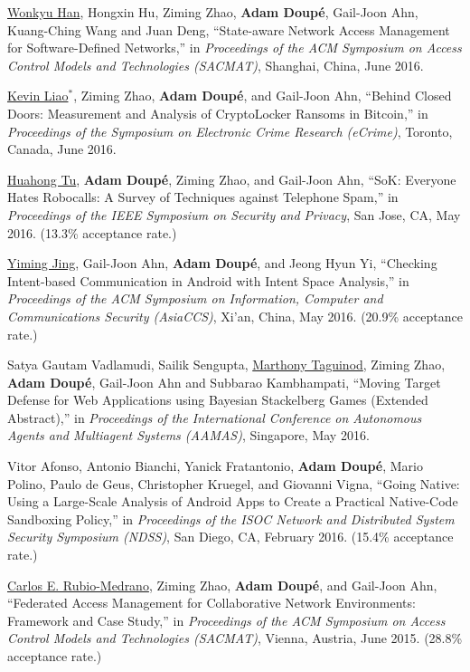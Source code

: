 \documentclass[11pt,letterpaper,sans]{moderncv}
\begin{document}
\begin{etaremune}
\item \underline{Wonkyu Han}, Hongxin Hu, Ziming Zhao, \textbf{Adam
  Doup\'e}, Gail-Joon Ahn, Kuang-Ching Wang and Juan Deng,
  ``State-aware Network Access Management for Software-Defined
  Networks,'' in \emph{Proceedings of the ACM Symposium on Access
    Control Models and Technologies (SACMAT)}, Shanghai, China, June
  2016.

\item \underline{Kevin Liao}$^*$, Ziming Zhao, \textbf{Adam Doup\'e},
  and Gail-Joon Ahn, ``Behind Closed Doors: Measurement and Analysis
  of CryptoLocker Ransoms in Bitcoin,'' in \emph{Proceedings of the
    Symposium on Electronic Crime Research (eCrime)}, Toronto, Canada,
  June 2016.

\item \underline{Huahong Tu}, \textbf{Adam Doup\'e}, Ziming Zhao, and
  Gail-Joon Ahn, ``SoK: Everyone Hates Robocalls: A Survey of
  Techniques against Telephone Spam,'' in \emph{Proceedings of the
    IEEE Symposium on Security and Privacy}, San Jose, CA, May 2016.
  (13.3\% acceptance rate.)

\item \underline{Yiming Jing}, Gail-Joon Ahn, \textbf{Adam Doup\'e},
  and Jeong Hyun Yi, ``Checking Intent-based Communication in Android
  with Intent Space Analysis,'' in \emph{Proceedings of the ACM
    Symposium on Information, Computer and Communications Security
  (AsiaCCS)}, Xi’an, China, May 2016. (20.9\% acceptance
  rate.)

\item Satya Gautam Vadlamudi, Sailik Sengupta, \underline{Marthony
  Taguinod}, Ziming Zhao, \textbf{Adam Doup\'e}, Gail-Joon Ahn and
  Subbarao Kambhampati, ``Moving Target Defense for Web Applications
  using Bayesian Stackelberg Games (Extended Abstract),'' in
  \emph{Proceedings of the International Conference on Autonomous
    Agents and Multiagent Systems (AAMAS)}, Singapore, May 2016.

\item Vitor Afonso, Antonio Bianchi, Yanick Fratantonio, \textbf{Adam
  Doup\'e}, Mario Polino, Paulo de Geus, Christopher Kruegel, and
  Giovanni Vigna, ``Going Native: Using a Large-Scale Analysis of
  Android Apps to Create a Practical Native-Code Sandboxing Policy,''
  in \emph{Proceedings of the ISOC Network and Distributed System
    Security Symposium (NDSS)}, San Diego, CA, February 2016. (15.4\%
  acceptance rate.)

\item \underline{Carlos E. Rubio-Medrano}, Ziming Zhao, \textbf{Adam
  Doup\'e}, and Gail-Joon Ahn, ``Federated Access Management for
  Collaborative Network Environments: Framework and Case Study,'' in
  \emph{Proceedings of the ACM Symposium on Access Control Models and
    Technologies (SACMAT)}, Vienna, Austria, June 2015. (28.8\%
  acceptance rate.)


\end{etaremune}
\end{document}
